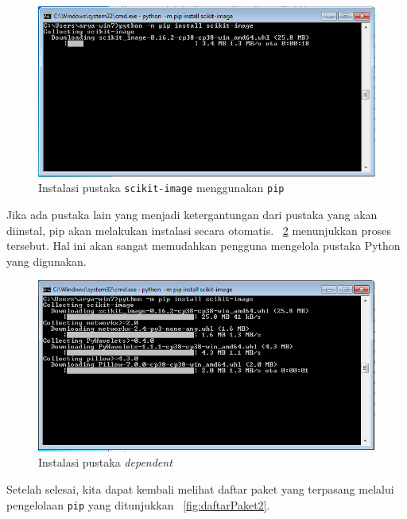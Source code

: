 \begin{figure}[h!]
  \begin{center}
    \includegraphics[scale=.5]{pics/installScikit-Image.png}
    \caption{Instalasi pustaka \texttt{scikit-image} menggunakan \texttt{pip}}
    \label{fig:installSkimage}
  \end{center}
\end{figure}

Jika ada pustaka lain yang menjadi ketergantungan dari pustaka yang akan diinstal, pip akan melakukan instalasi secara otomatis. \figurename~\ref{fig:installDepend} menunjukkan proses tersebut. Hal ini akan sangat memudahkan pengguna mengelola pustaka Python yang digunakan.

\begin{figure}[h!]
  \begin{center}
    \includegraphics[scale=.5]{pics/installScikit-Imagedependencies.png}
    \caption{Instalasi pustaka \textit{dependent}}
    \label{fig:installDepend}
  \end{center}
\end{figure}

Setelah selesai, kita dapat kembali melihat daftar paket yang terpasang melalui pengelolaan \texttt{pip} yang ditunjukkan \figurename~\ref{fig:daftarPaket2}.

